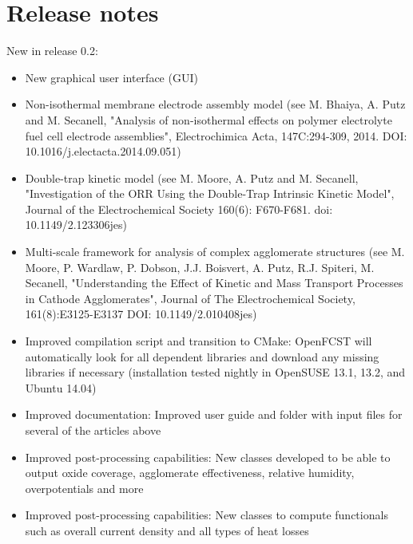 \section{Release notes} \label{main_changes}

New in release 0.2:
\begin{itemize}
 \item New graphical user interface (GUI)
 \item Non-isothermal membrane electrode assembly model (see M. Bhaiya, A. Putz and M. Secanell, "Analysis of non-isothermal effects on polymer electrolyte fuel cell electrode assemblies", Electrochimica Acta, 147C:294-309, 2014. DOI: 10.1016/j.electacta.2014.09.051)
  \item Double-trap kinetic model (see M. Moore, A. Putz and M. Secanell, "Investigation of the ORR Using the Double-Trap Intrinsic Kinetic Model", Journal of the Electrochemical Society 160(6): F670-F681. doi: 10.1149/2.123306jes)
  \item Multi-scale framework for analysis of complex agglomerate structures (see M. Moore, P. Wardlaw, P. Dobson, J.J. Boisvert, A. Putz, R.J. Spiteri, M. Secanell, "Understanding the Effect of Kinetic and Mass Transport Processes in Cathode Agglomerates", Journal of The Electrochemical Society, 161(8):E3125-E3137 DOI: 10.1149/2.010408jes)
  \item Improved compilation script and transition to CMake: OpenFCST will automatically look for all dependent libraries and download any missing libraries if necessary (installation tested nightly in OpenSUSE 13.1, 13.2, and Ubuntu 14.04)
  \item Improved documentation: Improved user guide and folder with input files for several of the articles above
  \item Improved post-processing capabilities: New classes developed to be able to output oxide coverage, agglomerate effectiveness, relative humidity, overpotentials and more
  \item Improved post-processing capabilities: New classes to compute functionals such as overall current density and all types of heat losses
\end{itemize}

